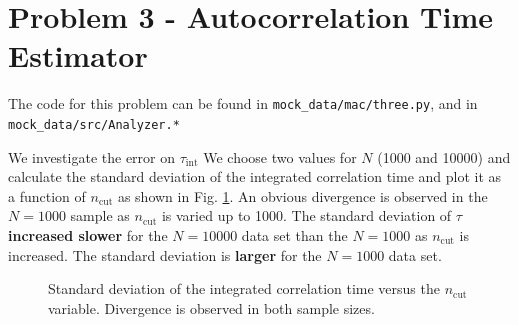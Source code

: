 \documentclass[singlepage,notitlepage,nofootinbib,11pt]{revtex4-1}
\begin{document}
\section{Problem 3 - Autocorrelation Time Estimator}
\begin{center}The code for this problem can be found in \verb|mock_data/mac/three.py|, and in \verb|mock_data/src/Analyzer.*| \end{center}
We investigate the error on $\tau_{\text{int}}$ We choose two values for $N$ (1000 and 10000) and calculate the standard deviation of the integrated correlation time and plot it as a function of $n_{\text{cut}}$ as shown in Fig. \ref{three}. An obvious divergence is observed in the $N=1000$ sample as $n_{\text{cut}}$ is varied up to 1000. The standard deviation of $\tau$ {\bf increased slower} for the $N=10000$ data set than the $N=1000$ as $n_{\text{cut}}$ is increased. The standard deviation is {\bf larger} for the $N=1000$ data set.
\begin{figure}[h]
\centering
  \captionsetup[subfigure]{labelformat=empty}
\caption{\label{three} Standard deviation of the integrated correlation time versus the $n_{\text{cut}}$ variable. Divergence is observed in both sample sizes.}
\end{figure}
\clearpage
\end{document}
